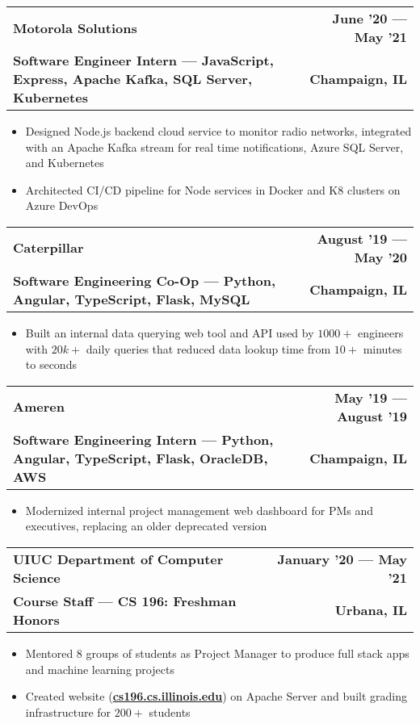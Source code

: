 \documentclass[letterpaper,11pt]{article}
\makeatletter
\newcommand{\resumeItem}[1]{
  \item\small{
    {#1 \vspace{-1pt}}
  }
}
\newcommand{\resumeSubheadingSmall}[4]{
  \vspace{-0pt}
  \item
    \begin{tabular*}{1\textwidth}[t]{l@{\extracolsep{\fill}}r}
      \large{\textbf{#1}} & \small{\color{main}\textbf{#2}} \\
      \color{secondary}\textbf{\footnotesize#3} & \color{secondary}\textbf{\footnotesize#4} \\
    \end{tabular*}\vspace{-7pt}
}
\newcommand{\resumeSubSubheading}[2]{
    \item
    \begin{tabular*}{0.97\textwidth}{l@{\extracolsep{\fill}}r}
      \textit{\small#1} & \textit{\small #2} \\
    \end{tabular*}\vspace{-7pt}
}
\newcommand{\resumeSubHeadingListEnd}{\end{itemize}}
\newcommand{\resumeItemListStart}{\begin{itemize}}
\newcommand{\resumeItemListEnd}{\end{itemize}\vspace{0pt}}
\makeatother
\begin{document}

    \resumeSubheadingSmall
      {Motorola Solutions} %
      {June '20 --- May '21} %
      {Software Engineer Intern --- JavaScript, Express, Apache Kafka, SQL Server, Kubernetes} %
      {Champaign, IL} %
      \resumeItemListStart
        \resumeItem{Designed Node.js backend cloud service to monitor radio networks, integrated with an Apache Kafka stream for real time notifications, Azure SQL Server, and Kubernetes }
        \resumeItem{Architected CI/CD pipeline for Node services in Docker and K8 clusters on Azure DevOps}
    \resumeItemListEnd

    \resumeSubheadingSmall
      {Caterpillar} %
      {August '19 --- May '20} %
      {Software Engineering Co-Op --- Python, Angular, TypeScript, Flask, MySQL} %
      {Champaign, IL} %
      \resumeItemListStart
        \resumeItem{Built an internal data querying web tool and API used by $1000+$ engineers with $20k+$ daily queries that reduced data lookup time from $10+$ minutes to seconds}
      \resumeItemListEnd

    \resumeSubheadingSmall
      {Ameren} %
      {May '19 --- August '19} %
      {Software Engineering Intern --- Python, Angular, TypeScript, Flask, OracleDB, AWS} %
      {Champaign, IL} %
      \resumeItemListStart
        \resumeItem{Modernized internal project management web dashboard for PMs and executives, replacing an older deprecated version}
      \resumeItemListEnd

    \resumeSubheadingSmall
      {UIUC Department of Computer Science} %
      {January '20 --- May '21} %
      {Course Staff --- CS 196: Freshman Honors} %
      {Urbana, IL} %
      \resumeItemListStart
        \resumeItem{Mentored 8 groups of students as Project Manager to produce full stack apps and machine learning projects}
        \resumeItem{Created website (\textbf{\href{https://cs196.cs.illinois.edu}{cs196.cs.illinois.edu}}) on Apache Server and built grading infrastructure for $200+$ students}
      \resumeItemListEnd
\end{document}
